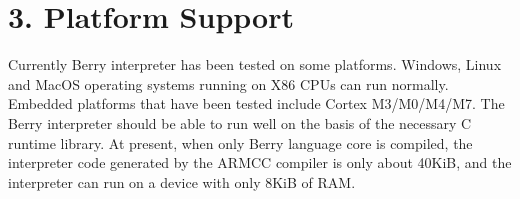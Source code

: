 \section*{3. Platform Support}

Currently Berry interpreter has been tested on some platforms. Windows, Linux and MacOS operating systems running on X86 CPUs can run normally. Embedded platforms that have been tested include Cortex M3/M0/M4/M7. The Berry interpreter should be able to run well on the basis of the necessary C runtime library. At present, when only Berry language core is compiled, the interpreter code generated by the ARMCC compiler is only about 40KiB, and the interpreter can run on a device with only 8KiB of RAM.